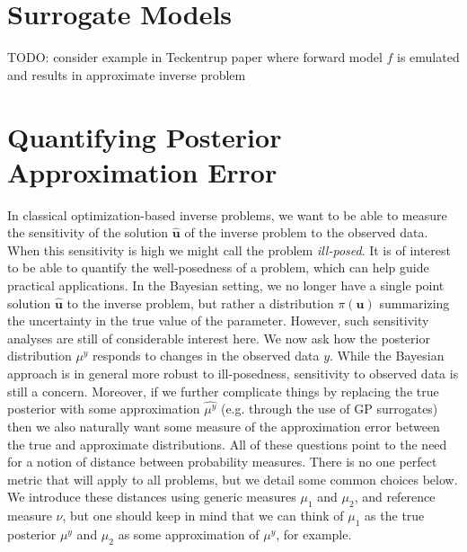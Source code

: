 \documentclass[12pt]{article}
\newcommand{\bpar}{\mathbf{u}} %
\begin{document}
\section{Surrogate Models}
TODO: consider example in Teckentrup paper where forward model $f$ is emulated and results in approximate inverse problem 

\section{Quantifying Posterior Approximation Error}
In classical optimization-based inverse problems, we want to be able to measure the sensitivity of the solution $\hat{\bpar}$ of the inverse problem to the observed data. When this sensitivity is high we might call the 
problem \textit{ill-posed}. It is of interest to be able to quantify the well-posedness of a problem, which can help guide practical applications. In the Bayesian setting, we no longer have a single point solution 
$\hat{\bpar}$ to the inverse problem, but rather a distribution $\pi(\bpar)$ summarizing the uncertainty in the true value of the parameter. However, such sensitivity analyses are still of considerable interest here. We now 
ask how the posterior distribution $\mu^y$ responds to changes in the observed data $y$. While the Bayesian approach is in general more robust to ill-posedness, sensitivity to observed data is still a concern. Moreover, if we further complicate things by replacing the true posterior with some approximation $\hat{\mu^y}$ (e.g. through the use of GP surrogates) then we also naturally want some measure of the approximation error between the true and approximate distributions. All of these questions point to the need for a notion of distance between probability measures. There is no one perfect metric that will apply to all problems, but we detail some common choices below. We introduce these distances using generic measures $\mu_1$ and $\mu_2$, and reference measure $\nu$, but one should keep in mind that we can think of $\mu_1$ as the true posterior 
$\mu^y$ and $\mu_2$ as some approximation of $\mu^y$, for example.  
\end{document}
